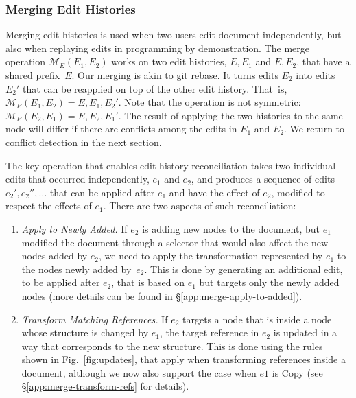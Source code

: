\documentclass[sigconf,anonymous,screen]{acmart}
\newcommand{\ident}[1]{{\sffamily #1}}
\newcommand{\note}[1]{\textcolor{red}{#1}}
\begin{document}
\subsubsection*{Merging Edit Histories}
Merging edit histories is used when two users edit document independently, but also
when replaying edits in programming by demonstration. The merge operation $\mathcal{M}_E(E_1, E_2)$
works on two edit histories, $E, E_1$ and $E, E_2$, that have a shared prefix~$E$.
Our merging is akin to git rebase. It turns edits $E_2$ into edits $E_2'$ that can be reapplied
on top of the other edit history. That~is, $\mathcal{M}_E(E_1, E_2) = E, E_1, E_2'$.
Note that the operation is not symmetric: $\mathcal{M}_E(E_2, E_1) = E, E_2, E_1'$. The
result of applying the two histories to the same node will differ if there are conflicts
among the edits in $E_1$ and $E_2$. We return to conflict detection in the next section.


The key operation that enables edit history reconciliation takes two individual edits that occurred
independently, $e_1$ and $e_2$, and produces a sequence of edits $e_2', e_2'', \ldots$ that
can be applied after $e_1$ and have the effect of $e_2$, modified to respect the effects of $e_1$.
There are two aspects of such reconciliation:

\begin{enumerate}
\item \emph{Apply to Newly Added.} If $e_2$ is adding new nodes to the document, but
  $e_1$ modified the document through a selector that would also affect the new nodes added by $e_2$,
  we need to apply the transformation represented by $e_1$ to the nodes newly added by~$e_2$.
  This is done by generating an additional edit, to be applied after $e_2$, that is based on
  $e_1$ but targets only the newly added nodes (more details can be found in \S\ref{app:merge-apply-to-added}).

\item \emph{Transform Matching References.} If $e_2$ targets a node that is inside a node
  whose structure is changed by $e_1$, the target reference in $e_2$ is updated in a way that
  corresponds to the new structure. This is done using the rules shown in Fig.~\ref{fig:updates},
  that apply when transforming references inside a document, although we now also support the case
  when $e1$ is \ident{Copy} (see \S\ref{app:merge-transform-refs} for details).
\end{enumerate}
\end{document}
